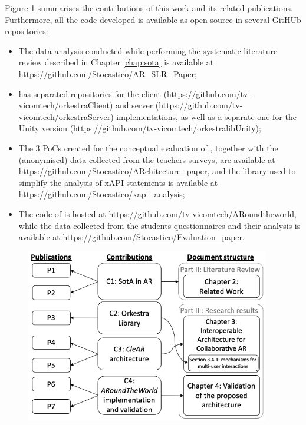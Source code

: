 Figure \ref{fig:contribs} summarises the contributions of this work and its related publications.
Furthermore, all the code developed is available as open source in several GitHUb repositories:

\begin{itemize}
    \item The data analysis conducted while performing the systematic literature review described in Chapter \ref{chap:sota} is available at \url{https://github.com/Stocastico/AR_SLR_Paper};
    \item \ork{} has separated repositories for the client (\url{https://github.com/tv-vicomtech/orkestraClient}) and server (\url{https://github.com/tv-vicomtech/orkestraServer}) implementations, as well as a separate one for the Unity version (\url{https://github.com/tv-vicomtech/orkestralibUnity});
    \item The 3 PoCs created for the conceptual evaluation of \arch{}, together with the (anonymised) data collected from the teachers surveys, are available at \url{https://github.com/Stocastico/ARchitecture_paper}, and the library used to simplify the analysis of xAPI statements is available at \url{https://github.com/Stocastico/xapi_analysis};
    \item The code of \appname{} is hosted at \url{https://github.com/tv-vicomtech/ARoundtheworld}, while the data collected from the students questionnaires and their analysis is available at \url{https://github.com/Stocastico/Evaluation_paper}.
\end{itemize}

\begin{figure}[htbp]
    \centering
    \includegraphics[width=0.95\textwidth]{Conclusions/figures/contrib_diagram.png}
    \caption{\fontsize{10pt}{11pt}}
    \label{fig:contribs}
\end{figure}

